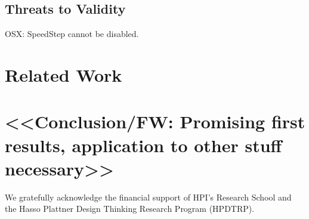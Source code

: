 \documentclass[preprint,english,10pt,nonatbib]{sigplanconf}
\begin{document}
\subsection{Threats to Validity}

OSX: SpeedStep cannot be disabled.

\section{Related Work}

\section{<<Conclusion/FW: Promising first results, application to other stuff necessary>>}

\acks
We gratefully acknowledge the financial support of HPI's Research School and
the Hasso Plattner Design Thinking Research Program (HPDTRP).

\printbibliography

\end{document}
